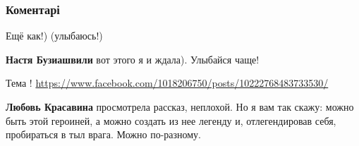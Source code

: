  
 
 
 
 
\subsubsection{Коментарі}


\begin{itemize}
 
Ещё как!) (улыбаюсь!)

\begin{itemize}
 
\textbf{Настя Бузиашвили} вот этого я и ждала). Улыбайся чаще!
\end{itemize}

 
Тема !
\url{https://www.facebook.com/1018206750/posts/10222768483733530/}

\begin{itemize}
 
\textbf{Любовь Красавина} просмотрела рассказ, неплохой. Но я вам так скажу: можно быть этой героиней, а можно создать из нее легенду и, отлегендировав себя, пробираться в тыл врага. Можно по-разному.


\end{itemize}
\end{itemize}
